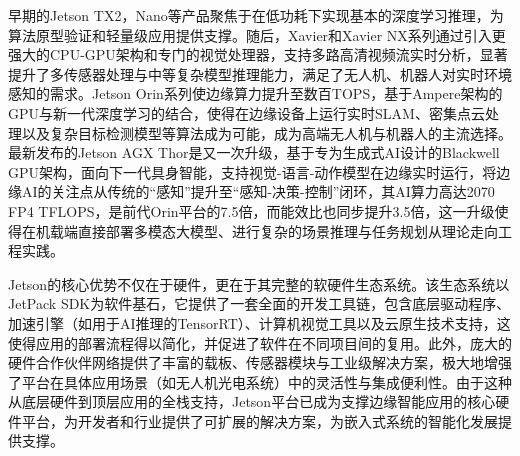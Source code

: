 早期的Jetson TX2，Nano等产品聚焦于在低功耗下实现基本的深度学习推理，为算法原型验证和轻量级应用提供支撑。随后，Xavier和Xavier NX系列通过引入更强大的CPU-GPU架构和专门的视觉处理器，支持多路高清视频流实时分析，显著提升了多传感器处理与中等复杂模型推理能力，满足了无人机、机器人对实时环境感知的需求。Jetson Orin系列使边缘算力提升至数百TOPS，基于Ampere架构的GPU与新一代深度学习的结合，使得在边缘设备上运行实时SLAM、密集点云处理以及复杂目标检测模型等算法成为可能，成为高端无人机与机器人的主流选择。最新发布的Jetson AGX Thor是又一次升级，基于专为生成式AI设计的Blackwell GPU架构，面向下一代具身智能，支持视觉-语言-动作模型在边缘实时运行，将边缘AI的关注点从传统的“感知”提升至“感知-决策-控制”闭环，其AI算力高达2070 FP4 TFLOPS，是前代Orin平台的7.5倍，而能效比也同步提升3.5倍，这一升级使得在机载端直接部署多模态大模型、进行复杂的场景推理与任务规划从理论走向工程实践。

Jetson的核心优势不仅在于硬件，更在于其完整的软硬件生态系统。该生态系统以JetPack SDK为软件基石，它提供了一套全面的开发工具链，包含底层驱动程序、加速引擎（如用于AI推理的TensorRT）、计算机视觉工具以及云原生技术支持，这使得应用的部署流程得以简化，并促进了软件在不同项目间的复用。此外，庞大的硬件合作伙伴网络提供了丰富的载板、传感器模块与工业级解决方案，极大地增强了平台在具体应用场景（如无人机光电系统）中的灵活性与集成便利性。由于这种从底层硬件到顶层应用的全栈支持，Jetson平台已成为支撑边缘智能应用的核心硬件平台，为开发者和行业提供了可扩展的解决方案，为嵌入式系统的智能化发展提供支撑。

